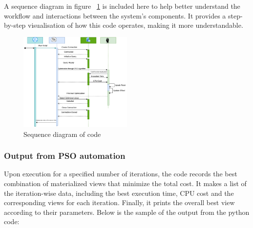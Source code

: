 \vspace{.4cm}

A sequence diagram in figure ~\ref{fig:Sequence_diagram} is included here to help better understand the workflow and interactions between the system's components. It provides a step-by-step visualisation of how this code operates, making it more understandable.
  


\clearpage




\begin{figure}[h]
    \centering
    \includegraphics[width=0.5\textwidth]{Figure/seq.diagram .png} %
    \caption{Sequence diagram of code}
    \label{fig:Sequence_diagram}
\end{figure}






\subsubsection{Output from PSO automation }  Upon execution for a specified number of iterations, the code records the best combination of materialized views that minimize the total cost. It makes a list of the iteration-wise data, including the best execution time, CPU cost and the corresponding views for each iteration. Finally, it prints the overall best view according to their parameters. Below is the sample of the output from the python code: \vspace{.4cm}



   \vspace{.4cm}
  


